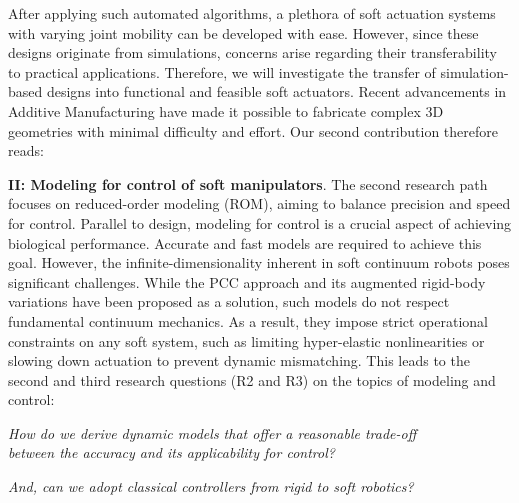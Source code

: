 After applying such automated algorithms, a plethora of soft actuation systems with varying joint mobility can be developed with ease. However, since these designs originate from simulations, concerns arise regarding their transferability to practical applications. Therefore, we will investigate the transfer of simulation-based designs into functional and feasible soft actuators. Recent advancements in Additive Manufacturing have made it possible to fabricate complex 3D geometries with minimal difficulty and effort. Our second contribution therefore reads:


\textbf{II: Modeling for control of soft manipulators}. The second research path focuses on reduced-order modeling (ROM), aiming to balance precision and speed for control. Parallel to design, modeling for control is a crucial aspect of achieving biological performance. Accurate and fast models are required to achieve this goal. However, the infinite-dimensionality inherent in soft continuum robots poses significant challenges. While the PCC approach and its augmented rigid-body variations have been proposed as a solution, such models do not respect fundamental continuum mechanics. As a result, they impose strict operational constraints on any soft system, such as limiting hyper-elastic nonlinearities or slowing down actuation to prevent dynamic mismatching. This leads to the second and third research questions (R2 and R3) on the topics of modeling and control: %
%
\begin{center}
\textit{
How do we derive dynamic models that offer a reasonable trade-off \\ between the accuracy and its applicability for control? }
\end{center}
\begin{center}
\textit{And, can we adopt classical controllers from rigid to soft robotics?}
\end{center}
%
